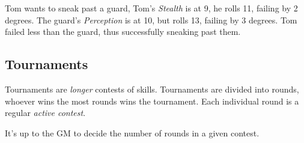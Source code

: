 \begin{example} 
    Tom wants to sneak past a guard, Tom's \textit{Stealth} is at 9, he rolls 11, failing by 2 degrees. 
    The guard's \textit{Perception} is at 10, but rolls 13, failing by 3 degrees. 
    Tom failed less than the guard, thus successfully sneaking past them.
\end{example}

\subsection{Tournaments}
Tournaments are \textit{longer} contests of skills.
Tournaments are divided into rounds, whoever wins the most rounds wins the tournament.
Each individual round is a regular \textit{active contest}.

It's up to the GM to decide the number of rounds in a given contest.